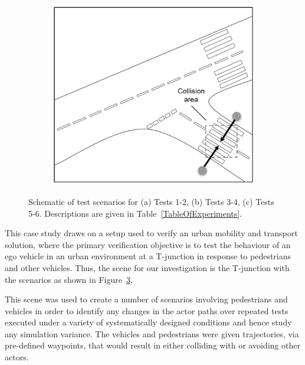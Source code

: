 \begin{figure}[!t]
\begin{subfigure}{.24\textwidth}
        \caption{}
        \label{Test_b}
    \end{subfigure}
    \begin{subfigure}{.24\textwidth}
        \includegraphics[width=1\textwidth]{../other/figures/det_fig3c}
        \caption{}
        \label{Test_c}
    \end{subfigure}
    \caption{Schematic of test scenarios for (a) Tests 1-2, (b) Tests 3-4, (c) Tests 5-6. Descriptions are given in Table~\ref{TableOfExperiments}.}\label{f:test_a_and_b}
\end{figure}

This case study draws on a setup used to verify an urban mobility and transport solution, where the primary verification objective is to test the behaviour of an ego vehicle in an urban environment at a T-junction in response to pedestrians and other vehicles. Thus, the scene for our investigation is the T-junction with the scenarios as shown in Figure~\ref{f:test_a_and_b}.

This scene was used to create a number of scenarios involving pedestrians and vehicles in order to identify any changes in the actor paths over repeated tests executed under a variety of systematically designed conditions and hence study any simulation variance. The vehicles and pedestrians were given trajectories, via pre-defined waypoints, that would result in either colliding with or avoiding other actors.

